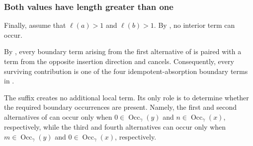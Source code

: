 \documentclass[11pt,a4paper,reqno]{amsart}
\newcommand{\Occ}{\operatorname{Occ}}
\theoremstyle{plain}
\theoremstyle{definition}
\numberwithin{equation}{section}
\begin{document}
	\subsubsection{Both values have length greater than one}
	
	Finally, assume that $\ell(a)>1$ and $\ell(b)>1$.
	By , no interior term can occur.
	
	By
	,
	every boundary term arising from the first alternative of
	 is paired with a term from the opposite
	insertion direction and cancels.  Consequently, every surviving contribution
	is one of the four idempotent-absorption boundary terms in
	.
	
	The suffix creates no additional local term.  Its only role is
	to determine whether the required boundary occurrences are present.  Namely,
	the first and second alternatives of
	 can occur only when $0\in\Occ_\gamma(y)$ and $n\in\Occ_\gamma(x)$, respectively, while the third and fourth alternatives can occur only when $m\in\Occ_\gamma(y)$ and $0\in\Occ_\gamma(x)$, respectively.
	
\end{document}
